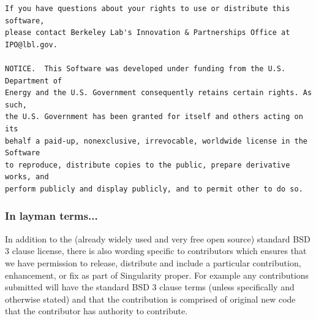 \documentclass[a4paper]{article}
\begin{document}
\begin{lstlisting}[frame=single]
If you have questions about your rights to use or distribute this software,
please contact Berkeley Lab's Innovation & Partnerships Office at
IPO@lbl.gov.

NOTICE.  This Software was developed under funding from the U.S. Department of
Energy and the U.S. Government consequently retains certain rights. As such,
the U.S. Government has been granted for itself and others acting on its
behalf a paid-up, nonexclusive, irrevocable, worldwide license in the Software
to reproduce, distribute copies to the public, prepare derivative works, and
perform publicly and display publicly, and to permit other to do so. 
\end{lstlisting}

\subsubsection{In layman terms...}

In addition to the (already widely used and very free open source) standard BSD 3 clause license, there is also wording specific to contributors which ensures that we have permission to release, distribute and include a particular contribution, enhancement, or fix as part of Singularity proper. For example any contributions submitted will have the standard BSD 3 clause terms (unless specifically and otherwise stated) and that the contribution is comprised of original new code that the contributor has authority to contribute.
\end{document}
